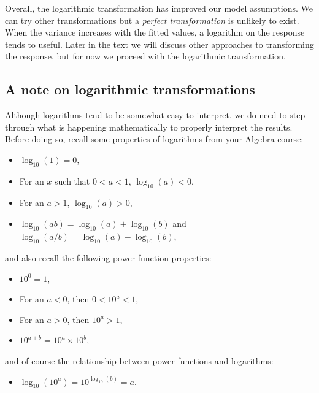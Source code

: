 \documentclass[
]{book}
\providecommand{\tightlist}{%
  \setlength{\itemsep}{0pt}\setlength{\parskip}{0pt}}
\begin{document}
Overall, the logarithmic transformation has improved our model assumptions.
We can try other transformations but a \emph{perfect transformation} is unlikely to exist.
When the variance increases with the fitted values, a logarithm on the response tends to useful.
Later in the text we will discuss other approaches to transforming the response, but for now we proceed with the logarithmic transformation.

\hypertarget{a-note-on-logarithmic-transformations}{%
\subsection{A note on logarithmic transformations}\label{a-note-on-logarithmic-transformations}}

Although logarithms tend to be somewhat easy to interpret, we do need to step through what is happening mathematically to properly interpret the results.
Before doing so, recall some properties of logarithms from your Algebra course:

\begin{itemize}
\tightlist
\item
  \(\log_{10}(1) = 0\),
\item
  For an \(x\) such that \(0 < a < 1\), \(\log_{10}(a) < 0\),
\item
  For an \(a>1\), \(\log_{10}(a) > 0\),
\item
  \(\log_{10}(ab) = \log_{10}(a) + \log_{10}(b)\) and \(\log_{10}(a/b) = \log_{10}(a) - \log_10(b)\),
\end{itemize}

and also recall the following power function properties:

\begin{itemize}
\tightlist
\item
  \(10^0 = 1\),
\item
  For an \(a < 0\), then \(0 < 10^a < 1\),
\item
  For an \(a > 0\), then \(10^a > 1\),
\item
  \(10^{a+b} = 10^a\times 10^b\),
\end{itemize}

and of course the relationship between power functions and logarithms:

\begin{itemize}
\tightlist
\item
  \(\log_{10}(10^a) = 10^{\log_{10}(b)} = a\).
\end{itemize}
\end{document}
